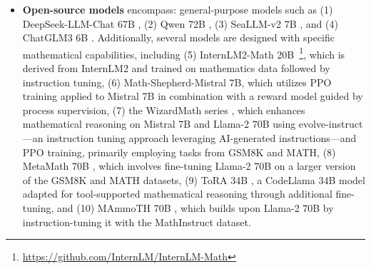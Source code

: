 \begin{itemize}[topsep=0pt]
Model mathematical proficiency is assessed under conditions with and without the use of external tools, across four quantitative reasoning benchmarks administered in both English and Chinese. Performance comparisons are made with the top models available during the same period:

\begin{itemize}[topsep=0pt]
    \item \textbf{Closed-source models} encompass: (1) the GPT series, particularly GPT-4 \citep{gpt4} and GPT-4 Code Interpreter~\footnote{\url{https://openai.com/blog/chatgpt-plugins\#\#code-interpreter}}, which currently stand as the most advanced; (2) Gemini Ultra and Pro \citep{gemini}; (3) Inflection-2 \citep{inflection-2}; (4) Grok-1~\footnote{\url{https://x.ai/model-card}}; in addition to recent offerings from Chinese companies such as (5) Baichuan-3~\footnote{\url{https://www.baichuan-ai.com}}, and (6) the newest model from the GLM series, GLM-4~\footnote{\url{https://open.bigmodel.cn/dev/api\#glm-4}} \citep{glm}.
\end{itemize}

These models serve broad applications, with most having been refined through various alignment strategies.
    \item \textbf{Open-source models} encompass: general-purpose models such as (1) DeepSeek-LLM-Chat 67B \citep{deepseek-llm}, (2) Qwen 72B \citep{qwen}, (3) SeaLLM-v2 7B \citep{seallm}, and (4) ChatGLM3 6B \citep{chatglm3}. Additionally, several models are designed with specific mathematical capabilities, including (5) InternLM2-Math 20B~\footnote{\url{https://github.com/InternLM/InternLM-Math}}, which is derived from InternLM2 and trained on mathematics data followed by instruction tuning, (6) Math-Shepherd-Mistral 7B, which utilizes PPO training \citep{schulman2017proximal} applied to Mistral 7B \citep{mistral} in combination with a reward model guided by process supervision, (7) the WizardMath series \citep{wizardmath}, which enhances mathematical reasoning on Mistral 7B and Llama-2 70B \citep{llama2} using evolve-instruct—an instruction tuning approach leveraging AI-generated instructions—and PPO training, primarily employing tasks from GSM8K and MATH, (8) MetaMath 70B \citep{metamath}, which involves fine-tuning Llama-2 70B on a larger version of the GSM8K and MATH datasets, (9) ToRA 34B \cite{tora}, a CodeLlama 34B model adapted for tool-supported mathematical reasoning through additional fine-tuning, and (10) MAmmoTH 70B \citep{MathInstruct}, which builds upon Llama-2 70B by instruction-tuning it with the MathInstruct dataset.


\end{itemize}
